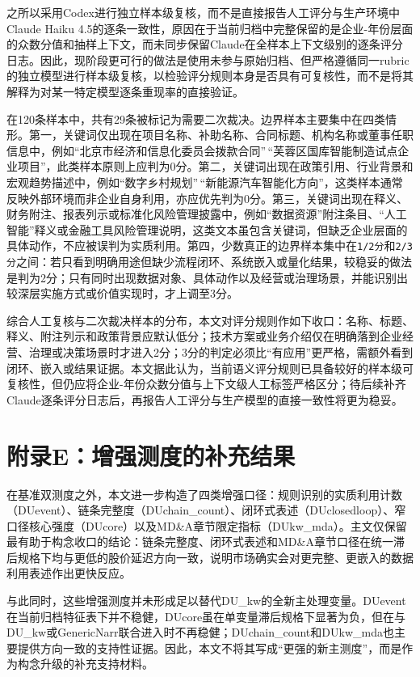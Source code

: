 之所以采用Codex进行独立样本级复核，而不是直接报告人工评分与生产环境中Claude Haiku 4.5的逐条一致性，原因在于当前归档中完整保留的是企业-年份层面的众数分值和抽样上下文，而未同步保留Claude在全样本上下文级别的逐条评分日志。因此，现阶段更可行的做法是使用未参与原始归档、但严格遵循同一rubric的独立模型进行样本级复核，以检验评分规则本身是否具有可复核性，而不是将其解释为对某一特定模型逐条重现率的直接验证。

在120条样本中，共有29条被标记为需要二次裁决。边界样本主要集中在四类情形。第一，关键词仅出现在项目名称、补助名称、合同标题、机构名称或董事任职信息中，例如``北京市经济和信息化委员会拨款合同''\,``芙蓉区国库智能制造试点企业项目''，此类样本原则上应判为0分。第二，关键词出现在政策引用、行业背景和宏观趋势描述中，例如``数字乡村规划''\,``新能源汽车智能化方向''，这类样本通常反映外部环境而非企业自身利用，亦应优先判为0分。第三，关键词出现在释义、财务附注、报表列示或标准化风险管理披露中，例如``数据资源''附注条目、``人工智能''释义或金融工具风险管理说明，这类文本虽包含关键词，但缺乏企业层面的具体动作，不应被误判为实质利用。第四，少数真正的边界样本集中在\texttt{1/2分}和\texttt{2/3分}之间：若只看到明确用途但缺少流程闭环、系统嵌入或量化结果，较稳妥的做法是判为2分；只有同时出现数据对象、具体动作以及经营或治理场景，并能识别出较深层实施方式或价值实现时，才上调至3分。

综合人工复核与二次裁决样本的分布，本文对评分规则作如下收口：名称、标题、释义、附注列示和政策背景应默认低分；技术方案或业务介绍仅在明确落到企业经营、治理或决策场景时才进入2分；3分的判定必须比``有应用''更严格，需额外看到闭环、嵌入或结果证据。本文据此认为，当前语义评分规则已具备较好的样本级可复核性，但仍应将企业-年份众数分值与上下文级人工标签严格区分；待后续补齐Claude逐条评分日志后，再报告人工评分与生产模型的直接一致性将更为稳妥。

\section{附录E：增强测度的补充结果}\label{ux9644ux5f55eux589eux5f3aux6d4bux5ea6ux7684ux8865ux5145ux7ed3ux679c}

在基准双测度之外，本文进一步构造了四类增强口径：规则识别的实质利用计数（DUevent）、链条完整度（DUchain\_count）、闭环式表述（DUclosedloop）、窄口径核心强度（DUcore）以及MD\&A章节限定指标（DUkw\_mda）。主文仅保留最有助于构念收口的结论：链条完整度、闭环式表述和MD\&A章节口径在统一滞后规格下均与更低的股价延迟方向一致，说明市场确实会对更完整、更嵌入的数据利用表述作出更快反应。

与此同时，这些增强测度并未形成足以替代DU\_kw的全新主处理变量。DUevent在当前归档特征表下并不稳健，DUcore虽在单变量滞后规格下显著为负，但在与DU\_kw或GenericNarr联合进入时不再稳健；DUchain\_count和DUkw\_mda也主要提供方向一致的支持性证据。因此，本文不将其写成``更强的新主测度''，而是作为构念升级的补充支持材料。

